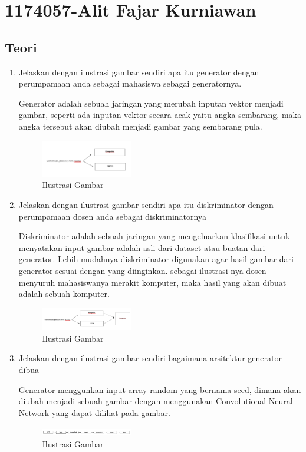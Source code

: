 \section{1174057-Alit Fajar Kurniawan}
    \subsection{Teori}
        \begin{enumerate}
            \item Jelaskan dengan ilustrasi gambar sendiri apa itu generator dengan perumpamaan anda sebagai mahasiswa sebagai generatornya.
            \par Generator adalah sebuah jaringan yang merubah inputan vektor menjadi gambar, seperti ada inputan vektor secara acak yaitu angka sembarang, maka angka tersebut akan diubah menjadi gambar yang sembarang pula.
            \begin{figure}[H]
                \includegraphics[width=4cm]{figures/1174057/chapter8/teori1.png}
                \centering
                  \caption{Ilustrasi Gambar}
            \end{figure}

            \item Jelaskan dengan ilustrasi gambar sendiri apa itu diskriminator dengan perumpamaan dosen anda sebagai diskriminatornya
            \par Diskriminator adalah sebuah jaringan yang mengeluarkan klasifikasi untuk menyatakan input gambar adalah asli dari dataset atau buatan dari generator. Lebih mudahnya diskriminator digunakan agar hasil gambar dari generator sesuai dengan yang diinginkan. sebagai ilustrasi nya dosen menyuruh mahasiswanya merakit komputer, maka hasil yang akan dibuat adalah sebuah komputer.
            \begin{figure}[H]
                \includegraphics[width=4cm]{figures/1174057/chapter8/teori2.png}
                \centering
                  \caption{Ilustrasi Gambar}
            \end{figure}

            \item Jelaskan dengan ilustrasi gambar sendiri bagaimana arsitektur generator dibua
            \par Generator menggunkan input array random yang bernama seed, dimana akan diubah menjadi sebuah gambar dengan menggunakan Convolutional Neural Network yang dapat dilihat pada gambar.
            \begin{figure}[H]
                \includegraphics[width=4cm]{figures/1174057/chapter8/teori3.png}
                \centering
                  \caption{Ilustrasi Gambar}
            \end{figure}


\end{enumerate}
